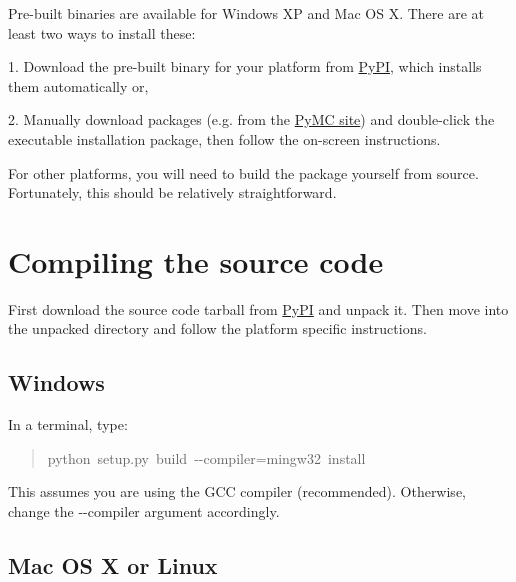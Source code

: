 Pre-built binaries are available for Windows XP and Mac OS X. There are at least
two ways to install these:

1. Download the pre-built binary for your platform from \href{http://pypi.python.org/pypi/pymc/}{PyPI}, which installs them
automatically or,

2. Manually download packages (e.g. from the \href{pymc.googlecode.com}{PyMC site}) and double-click
the executable installation package, then follow the on-screen instructions.

For other platforms, you will need to build the package yourself from source.
Fortunately, this should be relatively straightforward.



\hypertarget{compiling-the-source-code}{}
\section*{Compiling the source code}
\label{compiling-the-source-code}

First download the source code tarball from \href{http://pypi.python.org/pypi/pymc/}{PyPI} and unpack it. Then move
into the unpacked directory and follow the platform specific instructions.



\hypertarget{windows}{}
\subsection*{Windows}
\label{windows}

In a terminal, type:
\begin{quote}{\ttfamily \raggedright \noindent
python~setup.py~build~-{}-compiler=mingw32~install
}\end{quote}

This assumes you are using the GCC compiler (recommended). Otherwise,
change the -{}-compiler argument accordingly.



\hypertarget{mac-os-x-or-linux}{}
\subsection*{Mac OS X or Linux}
\label{mac-os-x-or-linux}

